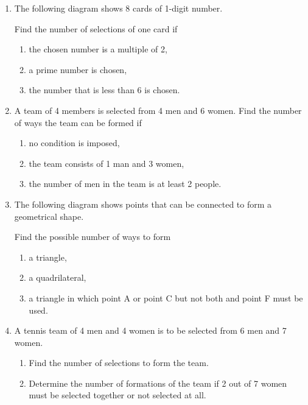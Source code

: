 \documentclass{report}
\begin{document}
\begin{multicols*}{2}
\begin{enumerate}
            \item The following diagram shows 8 cards of 1-digit number.

                  Find the number of selections of one card if

                  \begin{enumerate}
                        \item the chosen number is a multiple of 2,
                        \item a prime number is chosen,
                        \item the number that is less than 6 is chosen.
                  \end{enumerate}

            \item A team of 4 members is selected from 4 men and 6 women. Find the number of ways
                  the team can be formed if
                  \begin{enumerate}
                        \item no condition is imposed,
                        \item the team consists of 1 man and 3 women,
                        \item the number of men in the team is at least 2 people.
                  \end{enumerate}

            \item The following diagram shows points that can be connected to form a geometrical
                  shape.

                  Find the possible number of ways to form
                  \begin{enumerate}
                        \item a triangle,
                        \item a quadrilateral,
                        \item a triangle in which point A or point C but not both and point F must be used.
                  \end{enumerate}

            \item A tennis team of 4 men and 4 women is to be selected from 6 men and 7 women.
                  \begin{enumerate}
                        \item Find the number of selections to form the team.
                        \item Determine the number of formations of the team if 2 out of 7 women must be
                              selected together or not selected at all.
                  \end{enumerate}


\end{enumerate}
\end{multicols*}
\end{document}
